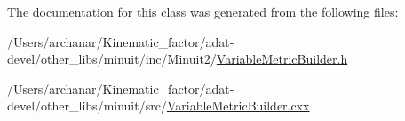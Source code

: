 The documentation for this class was generated from the following files\+:\begin{DoxyCompactItemize}
\item 
/\+Users/archanar/\+Kinematic\+\_\+factor/adat-\/devel/other\+\_\+libs/minuit/inc/\+Minuit2/\mbox{\hyperlink{adat-devel_2other__libs_2minuit_2inc_2Minuit2_2VariableMetricBuilder_8h}{Variable\+Metric\+Builder.\+h}}\item 
/\+Users/archanar/\+Kinematic\+\_\+factor/adat-\/devel/other\+\_\+libs/minuit/src/\mbox{\hyperlink{adat-devel_2other__libs_2minuit_2src_2VariableMetricBuilder_8cxx}{Variable\+Metric\+Builder.\+cxx}}\end{DoxyCompactItemize}
